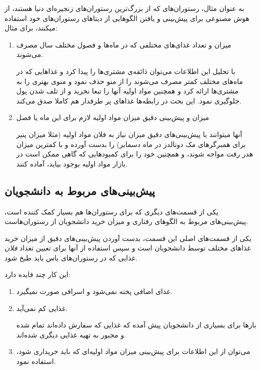 \documentclass{article}
\begin{document}
	    	به عنوان مثال، رستوران‌های  که از بزرگ‌ترین رستوران‌های زنجیره‌ای دنیا هستند، از هوش مصنوعی برای پیش‌بینی و یافتن الگوهایی از دیتا‌های رستوران‌های خود استفاده میکنند، برای مثال:
	    	\begin{enumerate}
	    		\item 
	    		میزان و تعداد غذای‌های مختلفی که در ماه‌‌ها و فصول مختلف سال مصرف می‌شوند. 
	    		
	    		
	    		با تحلیل این اطلاعات می‌توان ذائقه‌ی مشتری‌ها را پیدا کرد و غذاهایی که در ماه‌‌های مختلف کمتر مصرف می‌شوند را از منو حذف نمود و منوی بهتری را به مشتری‌‌ها ارائه کرد و همچنین مواد اولیه آنها را تبعا نخرید و از تلف شدن پول جلوگیری نمود. این بحث در رابطه‌ها غذاهای پر طرفدار هم کاملا صدق می‌کند.
	    		
	    		\item 
	    		میزان و پیش‌‌بینی دقیق میزان مواد اولیه لازم برای این ماه یا فصل
	    		
	    		
	    		آنها میتوانند با پیش‌بینی‌های دقیق میزان نیاز به فلان مواد اولیه (مثلا میزان پنیر برای همبرگر‌های مک دونالدز در ماه دسمابر) را بدست آورده و با کمترین میزان هدر رفت مواجه شوند، و همچنین خود را برای کمبود‌هایی که گاهی ممکن است در بازار مواد اولیه بوجود بیاید، آماده کنند.
	    	\end{enumerate}
	    \subsection{پیش‌بینی‌های مربوط به دانشجویان}
	    	یکی از قسمت‌های دیگری که برای رستوران‌ها هم بسیار کمک کننده است، پیش‌بینی‌های مربوط به الگو‌های رفتاری و میزان خرید دانشجویان از رستوران‌هاست.
	    	
	    	یکی از قسمت‌های اصلی این قسمت، بدست آوردن پیش‌بینی‌های دقیق از میزان خرید غذا‌های مختلف توسط دانشجویان است و سپس استفاده از آنها برای تعیین تعداد \textit{فلان} غذایی که در رستوران‌های یاس باید طبخ شود.
	    	
	    	این کار چند فایده‌ دارد:
	    	\begin{enumerate}
	    		\item 
	    		غذای اضافی پخته نمی‌شود و اسرافی صورت نمیگیرد.
	    		\item 
	    		غذایی کم نمی‌آید.
	    		
	    		بارها برای بسیاری از دانشجویان پیش آمده که غذایی که سفارش داده‌اند تمام شده و مجبور به تهیه غذایی دیگری شده‌اند.
	    		\item 
	    		می‌توان از این اطلاعات برای پیش‌بینی میزان مواد اولیه‌ای که باید خریداری شود، استفاده نمود.
	    	\end{enumerate}
\end{document}
